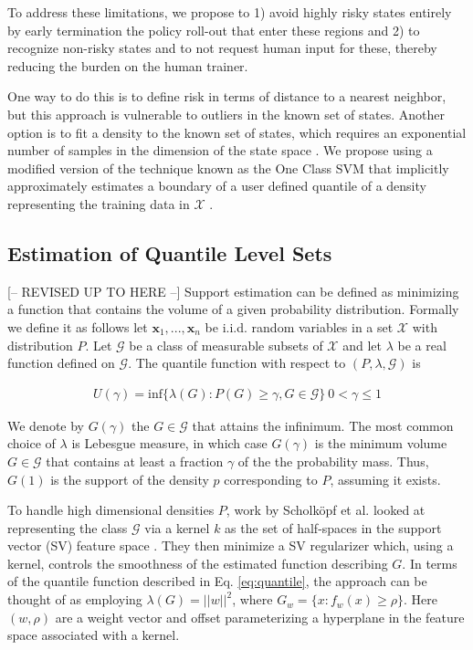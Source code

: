 \documentclass[10pt, conference]{ieeeconf}      %
\begin{document}
To address these limitations, we propose to 1) avoid highly risky states entirely by early termination the policy
roll-out that enter these regions and 2) to recognize non-risky states and to not request human input for these,
thereby reducing the burden on the human trainer. 

One way to do this is to define risk in terms of distance to a nearest neighbor, but this approach is vulnerable to
outliers in the known set of states. Another option is to fit a density to the known set of states, which requires an
exponential number of samples in the dimension of the state space \cite{nadaraya1964estimating}. We propose using a
modified version of the technique known as the One Class SVM that implicitly approximately estimates a boundary of a user defined quantile of
a density representing the training data in $\mathcal{X}$ \cite{scholkopf2001estimating}.


\subsection{Estimation of Quantile Level Sets}\label{sec:level}
{\color{blue} [-- REVISED UP TO HERE --]}
Support estimation can be defined as minimizing a function that contains the volume of a given probability distribution. Formally we define it as follows let $\mathbf{x}_1,...,\mathbf{x}_n $ be i.i.d. random variables in a set $\mathcal{X}$ with distribution $P$. Let $\mathcal{G}$ be a class of measurable subsets of $\mathcal{X}$ and let $\lambda$ be a real function defined on $\mathcal{G}$. The quantile function with respect to $(P,\lambda,\mathcal{G})$ is 

\vspace{-2ex}
\begin{align}\label{eq:quantile}
U(\gamma) = \mbox{inf} \lbrace \lambda(G):P(G) \geq \gamma, G \in \mathcal{G} \rbrace \: 0<\gamma \leq 1
\end{align} 


We denote by $G(\gamma)$ the $G \in \mathcal{G}$ that attains the infinimum. The most common choice of $\lambda$ is Lebesgue measure, in which case $G(\gamma)$ is the minimum volume $G \in \mathcal{G}$ that contains at least a fraction $\gamma$ of the the probability mass. Thus, $G(1)$ is the support of the density $p$ corresponding to $P$, assuming it exists. 

To handle high dimensional densities $P$, work by Scholk{\"o}pf et al.  looked at representing the class $\mathcal{G}$ via a kernel $k$ as the set of half-spaces in the support vector (SV) feature space \cite{scholkopf2001estimating}. They then minimize a SV  regularizer which, using a kernel, controls the smoothness of the estimated function describing $G$. In terms of the quantile function described in Eq. \ref{eq:quantile}, the approach can be thought of as employing $\lambda(G) = ||w||^2$, where $G_w = \lbrace x: f_w(x) \geq \rho \rbrace$. Here $(w,\rho)$ are a weight vector and offset parameterizing a hyperplane in the feature space associated with a kernel. 
\end{document}
